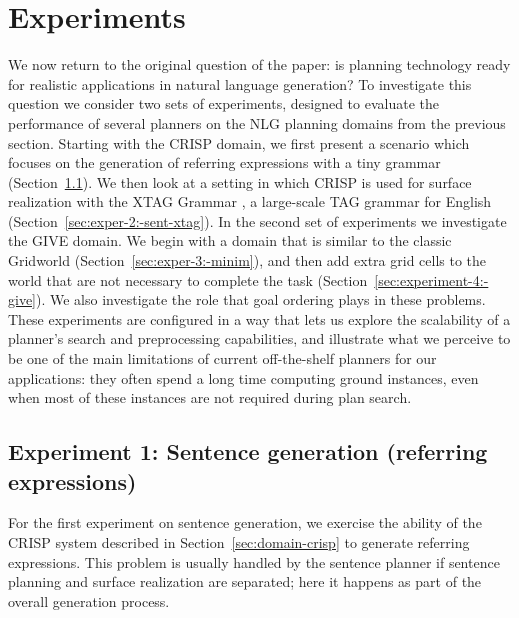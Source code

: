 \section{Experiments}
\label{sec:experiments}

We now return to the original question of the paper: is planning technology
ready for realistic applications in natural language generation? To investigate
this question we consider two sets of experiments, designed to evaluate the
performance of several planners on the NLG planning domains from the previous
section. Starting with the CRISP domain, we first present a scenario which
focuses on the generation of referring expressions with a tiny grammar
(Section~\ref{sec:exper-1:-sent}). We then look at a setting in which CRISP is
used for surface realization with the XTAG Grammar \citep{xtag01:_tr}, a
large-scale TAG grammar for English (Section~\ref{sec:exper-2:-sent-xtag}). In
the second set of experiments we investigate the GIVE domain. We begin with a
domain that is similar to the classic Gridworld
(Section~\ref{sec:exper-3:-minim}), and then add extra grid cells to the world
that are not necessary to complete the task
(Section~\ref{sec:experiment-4:-give}). We also investigate the role that goal
ordering plays in these problems. These experiments are configured in a way that
lets us explore the scalability of a planner's search and preprocessing
capabilities, and illustrate what we perceive to be one of the main limitations
of current off-the-shelf planners for our applications: they often spend a long
time computing ground instances, even when most of these instances are not
required during plan search.



\subsection{Experiment 1: Sentence generation (referring expressions)}
\label{sec:exper-1:-sent}

For the first experiment on sentence generation, we exercise the
ability of the CRISP system described in
Section~\ref{sec:domain-crisp} to generate referring expressions. This
problem is usually handled by the sentence planner if sentence
planning and surface realization are separated; here it happens as
part of the overall generation process. 

